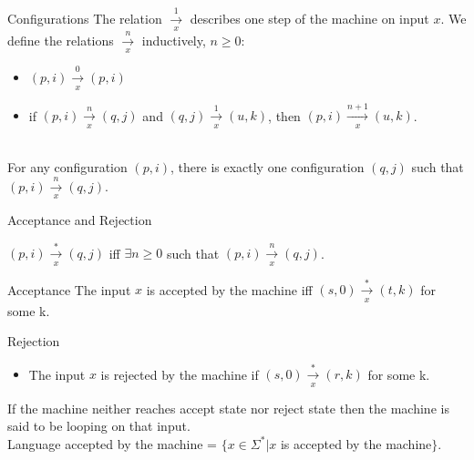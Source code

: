 \documentclass{beamer}
\begin{document}
\begin{frame}{Configurations }
The relation $\xrightarrow[x]{1}$ describes one step of the machine on input $x$. We define the relations $\xrightarrow[x]{n}$ inductively, $n \geq 0$:
\begin{itemize}
\item $(p, i) \xrightarrow[x]{0} (p, i)$
\item if $(p, i) \xrightarrow[x]{n}(q, j)$ and $(q, j) \xrightarrow[x]{1} (u, k)$, then $(p, i) \xrightarrow[x]{n+1} (u, k)$.
\end{itemize}
\hspace*{1cm}\\
For any configuration $(p, i)$, there is exactly one configuration $(q, j)$ such that $(p, i) \xrightarrow[x]{n} (q, j)$. \\


\end{frame}
\begin{frame}{Acceptance and Rejection}
  
    \hspace*{1cm}$(p,i) \xrightarrow[x]{*} (q,j)$ iff  $\exists$$n \geq 0$ such that $(p,i) \xrightarrow[x]{n} (q,j)$.
    
\begin{block}{Acceptance}
The input $x$ is accepted by the machine iff $(s, 0) \xrightarrow[x]{*} (t, k)$ for some k.
\end{block}
\begin{block}{Rejection}
  \begin{itemize}
\item The input $x$ is rejected by the machine if $(s, 0) \xrightarrow[x]{*} (r, k)$ for some k.
\end{itemize}
\end{block}

  
 If the machine neither reaches accept state nor reject state then the machine is said to be looping on that input.\\
 
Language accepted by the machine = $\{x \in \Sigma^{*} | x$ is accepted by the machine$\}$.

  \end{frame}
\end{document}
